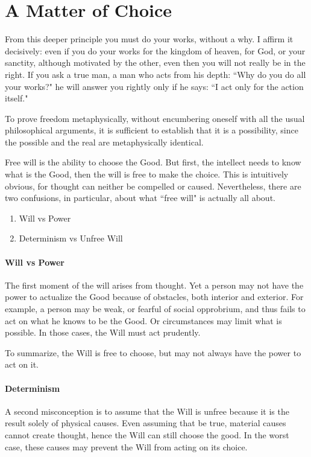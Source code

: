 \section{A Matter of Choice}

\begin{quotex}
From this deeper principle you must do your works, without a why. I affirm it decisively: even if you do your works for the kingdom of heaven, for God, or your sanctity, although motivated by the other, even then you will not really be in the right. If you ask a true man, a man who acts from his depth: ``Why do you do all your works?" he will answer you rightly only if he says: ``I act only for the action itself." 

To prove freedom metaphysically, without encumbering oneself with all the usual philosophical arguments, it is sufficient to establish that it is a possibility, since the possible and the real are metaphysically identical. 

\end{quotex}
Free will is the ability to choose the Good. But first, the intellect needs to know what is the Good, then the will is free to make the choice. This is intuitively obvious, for thought can neither be compelled or caused. Nevertheless, there are two confusions, in particular, about what ``free will" is actually all about.

\begin{enumerate}
\item Will vs Power 
\item Determinism vs Unfree Will 
\end{enumerate}
\paragraph{Will vs Power}
The first moment of the will arises from thought. Yet a person may not have the power to actualize the Good because of obstacles, both interior and exterior. For example, a person may be weak, or fearful of social opprobrium, and thus fails to act on what he knows to be the Good. Or circumstances may limit what is possible. In those cases, the Will must act prudently.

To summarize, the Will is free to choose, but may not always have the power to act on it.

\paragraph{Determinism}
A second misconception is to assume that the Will is unfree because it is the result solely of physical causes. Even assuming that be true, material causes cannot create thought, hence the Will can still choose the good. In the worst case, these causes may prevent the Will from acting on its choice.

